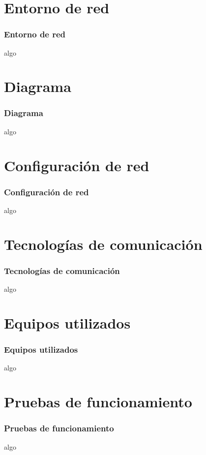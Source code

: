 \section{Entorno de red}
  \begin{frame}
    \frametitle{Entorno de red}
    algo
  \end{frame}
\section{Diagrama}
  \begin{frame}
    \frametitle{Diagrama}
    algo
  \end{frame}
\section{Configuraci\'on de red}
  \begin{frame}
    \frametitle{Configuraci\'on de red}
    algo
  \end{frame}
\section{Tecnolog\'ias de comunicaci\'on}
  \begin{frame}
    \frametitle{Tecnolog\'ias de comunicaci\'on}
    algo
  \end{frame}
\section{Equipos utilizados}
  \begin{frame}
    \frametitle{Equipos utilizados}
    algo
  \end{frame}
\section{Pruebas de funcionamiento}
  \begin{frame}
    \frametitle{Pruebas de funcionamiento}
    algo
  \end{frame}
